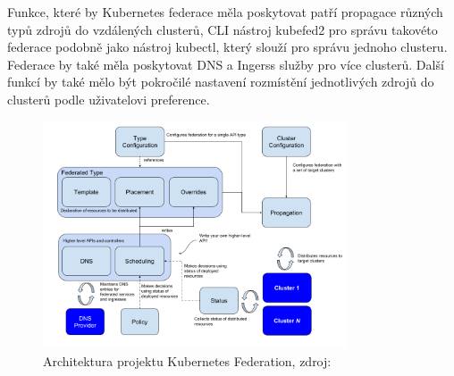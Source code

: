         Funkce, které by Kubernetes federace měla poskytovat patří propagace různých typů zdrojů do vzdálených clusterů, CLI nástroj kubefed2 pro správu takovéto federace podobně jako nástroj kubectl, který slouží pro správu jednoho clusteru. Federace by také měla poskytovat DNS a Ingerss služby pro více clusterů. Další funkcí by také mělo být pokročilé nastavení rozmístění jednotlivých zdrojů do clusterů podle uživatelovi preference.


\begin{figure}[H]
  \begin{centering}
	  \includegraphics[width=0.8\textwidth]{images/k8s-federated.png}
    \par
	  \caption{Architektura projektu Kubernetes Federation\label{fig:k8s-federated}, zdroj: }
    \end{centering}
\end{figure}
	
